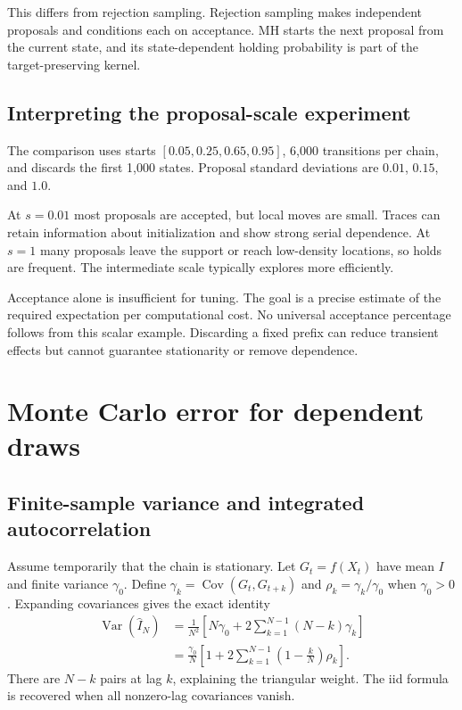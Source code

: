 \documentclass[11pt,a4paper]{article}
\newcommand{\Var}{\operatorname{Var}}
\newcommand{\Cov}{\operatorname{Cov}}
\begin{document}
This differs from rejection sampling. Rejection sampling makes independent
proposals and conditions each on acceptance. MH starts the next proposal from
the current state, and its state-dependent holding probability is part of
the target-preserving kernel.

\subsection{Interpreting the proposal-scale experiment}
The comparison uses starts $[0.05,0.25,0.65,0.95]$, 6,000 transitions per
chain, and discards the first 1,000 states. Proposal standard deviations
are $0.01$, $0.15$, and $1.0$.

At $s=0.01$ most proposals are accepted, but local moves are small. Traces
can retain information about initialization and show strong serial dependence.
At $s=1$ many proposals leave the support or reach low-density locations, so
holds are frequent. The intermediate scale typically explores more efficiently.

Acceptance alone is insufficient for tuning. The goal is a precise estimate
of the required expectation per computational cost. No universal acceptance
percentage follows from this scalar example. Discarding a fixed prefix can
reduce transient effects but cannot guarantee stationarity or remove dependence.

\section{Monte Carlo error for dependent draws}
\subsection{Finite-sample variance and integrated autocorrelation}
Assume temporarily that the chain is stationary. Let $G_t=f(X_t)$ have mean
$I$ and finite variance $\gamma_0$. Define
$\gamma_k=\Cov(G_t,G_{t+k})$ and $\rho_k=\gamma_k/\gamma_0$ when
$\gamma_0>0$. Expanding covariances gives the exact identity
\begin{align*}
 \Var(\widehat I_N)
 &=\frac1{N^2}\left[N\gamma_0+
                 2\sum_{k=1}^{N-1}(N-k)\gamma_k\right]\\
 &=\frac{\gamma_0}{N}
 \left[1+2\sum_{k=1}^{N-1}\left(1-\frac kN\right)\rho_k\right].
\end{align*}
There are $N-k$ pairs at lag $k$, explaining the triangular weight. The iid
formula is recovered when all nonzero-lag covariances vanish.
\end{document}
